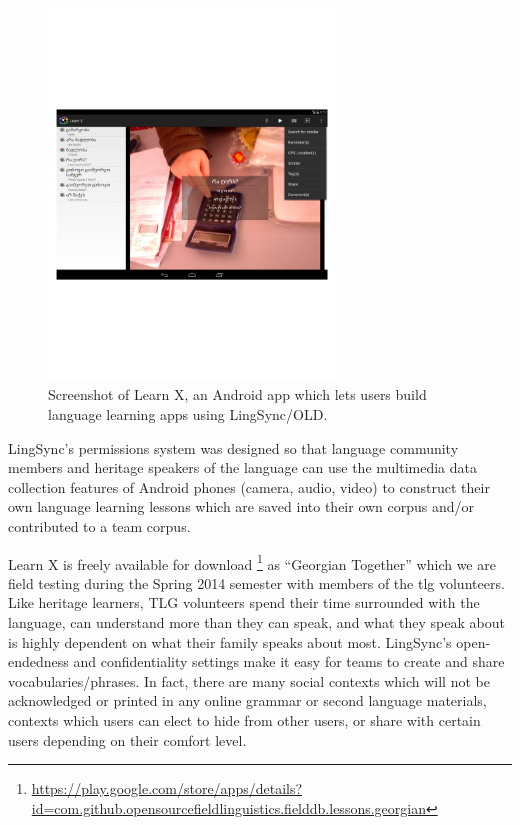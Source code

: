 \documentclass[11pt]{article}
\begin{document}
\begin{figure}
\begin{center}
\includegraphics[width=3in]{images/learnX}
\caption{Screenshot of Learn X, an Android app which lets users build language
learning apps using LingSync/OLD.}
\label{learn_x_screenshot}
\end{center}
\end{figure}

LingSync's permissions system was designed so that language community members
and heritage speakers of the language can use the multimedia data collection
features of Android phones (camera, audio, video) to construct their own
language learning lessons which are saved into their own corpus and/or
contributed to a team corpus.

Learn X is freely available for download%
\footnote{\url{https://play.google.com/store/apps/details?id=com.github.opensourcefieldlinguistics.fielddb.lessons.georgian}} %
as ``Georgian Together'' which we are field testing during the Spring 2014
semester with members of the \gls{tlg} volunteers.  Like heritage learners, TLG
volunteers spend their time surrounded with the language, can understand more
than they can speak, and what they speak about is highly dependent on what
their family speaks about most. LingSync's open-endedness and confidentiality
settings make it easy for teams to create and share vocabularies/phrases.
In fact, there are many social contexts which will not be acknowledged or
printed in any online grammar or second language materials, contexts which
users can elect to hide from other users, or share with certain users depending
on their comfort level.
\end{document}

